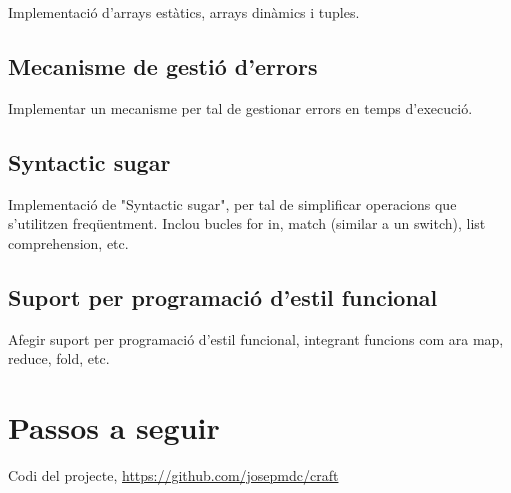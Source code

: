 ﻿\documentclass{article}
\begin{document}
Implementació d'arrays estàtics, arrays dinàmics i tuples.

\subsection{Mecanisme de gestió d'errors}
Implementar un mecanisme per tal de gestionar errors en temps d'execució.

\subsection{Syntactic sugar}
Implementació de "Syntactic sugar", per tal de simplificar operacions que
s'utilitzen freqüentment. Inclou bucles for in, match (similar a un switch),
list comprehension, etc.

\subsection{Suport per programació d'estil funcional}
Afegir suport per programació d'estil funcional, integrant funcions com ara map,
reduce, fold, etc.

\section{Passos a seguir}

\begin{thebibliography}{9}

 Codi del projecte, \url{https://github.com/josepmdc/craft}

\end{thebibliography}
\end{document}
